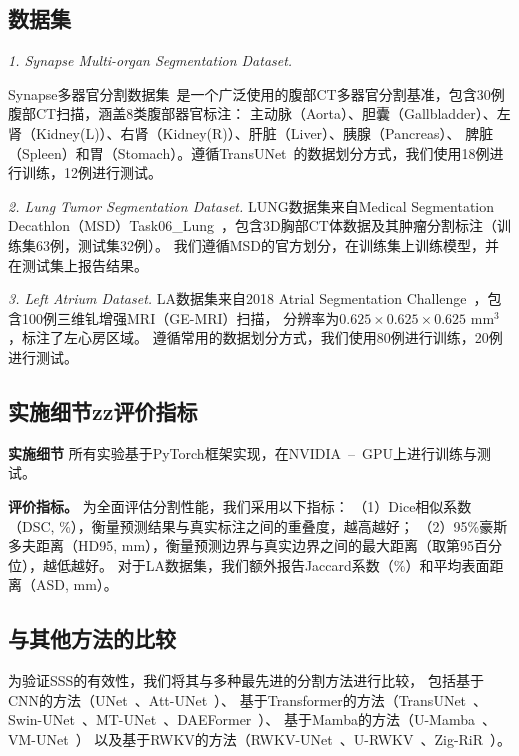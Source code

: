 \documentclass[conference]{IEEEtran}   %
\begin{document}
\subsection{数据集}

\textit{1. Synapse Multi-organ Segmentation Dataset.}


Synapse多器官分割数据集~\cite{synapse}是一个广泛使用的腹部CT多器官分割基准，包含30例腹部CT扫描，涵盖8类腹部器官标注：
主动脉（Aorta）、胆囊（Gallbladder）、左肾（Kidney(L)）、右肾（Kidney(R)）、肝脏（Liver）、胰腺（Pancreas）、
脾脏（Spleen）和胃（Stomach）。遵循TransUNet~\cite{transunet}的数据划分方式，我们使用18例进行训练，12例进行测试。



\textit{2. Lung Tumor Segmentation Dataset.}
LUNG数据集来自Medical Segmentation Decathlon（MSD）Task06\_Lung~\cite{msd}，包含3D胸部CT体数据及其肿瘤分割标注（训练集63例，测试集32例）。
我们遵循MSD的官方划分，在训练集上训练模型，并在测试集上报告结果。

\textit{3. Left Atrium Dataset.}
LA数据集来自2018 Atrial Segmentation Challenge~\cite{la_dataset}，包含100例三维钆增强MRI（GE-MRI）扫描，
分辨率为$0.625\times0.625\times0.625$ mm$^3$，标注了左心房区域。
遵循常用的数据划分方式，我们使用80例进行训练，20例进行测试。

\subsection{实施细节zz评价指标}

\textbf{实施细节}
所有实验基于PyTorch框架实现，在NVIDIA~--~GPU上进行训练与测试。

\textbf{评价指标。}
为全面评估分割性能，我们采用以下指标：
（1）Dice相似系数（DSC, \%），衡量预测结果与真实标注之间的重叠度，越高越好；
（2）95\%豪斯多夫距离（HD95, mm），衡量预测边界与真实边界之间的最大距离（取第95百分位），越低越好。
对于LA数据集，我们额外报告Jaccard系数（\%）和平均表面距离（ASD, mm）。

\subsection{与其他方法的比较}

为验证SSS的有效性，我们将其与多种最先进的分割方法进行比较，
包括基于CNN的方法（UNet~\cite{Unet}、Att-UNet~\cite{attetion-unet}）、
基于Transformer的方法（TransUNet~\cite{transunet}、Swin-UNet~\cite{swinunet}、MT-UNet~\cite{mtUNet}、DAEFormer~\cite{daeformer}）、
基于Mamba的方法（U-Mamba~\cite{umamba}、VM-UNet~\cite{vmunet}）
以及基于RWKV的方法（RWKV-UNet~\cite{RWKV-UNet}、U-RWKV~\cite{urwkv}、Zig-RiR~\cite{zigrir}）。
\end{document}
